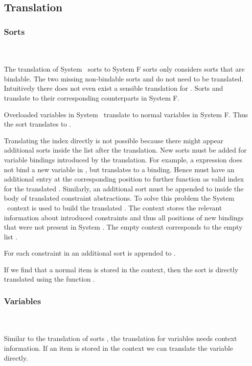 \subsection{Translation}
\subsubsection{Sorts}\hfill\\\\
The translation of System \Fo\ sorts to System F sorts only considers sorts that are bindable. 
The two missing non-bindable sorts  and  do not need to be translated. 
Intuitively there does not even exist a sensible translation for .
\DPTSort
Sorts  and  translate to their corresponding counterparts in System F. 

\noindent  Overloaded variables in System \Fo\ translate to normal variables in System F. 
Thus the sort  translates to . 

\noindent Translating the index  directly is not possible because there might appear additional sorts inside the list after the translation. 
New sorts must be added for variable bindings introduced by the translation. 
For example, a    \Constr{=}    expression does not bind a new variable in , but translates to a     binding. 
Hence  must have an additional entry  at the corresponding position to further function as valid index for the translated . Similarly, an additional sort  must be appended to  inside the body of translated constraint abstractions.
To solve this problem the System \Fo\ context  is used to build the translated . 
The context stores the relevant information about introduced constraints and thus all positions of new bindings that were not present in System \Fo. 
\DPTSorts
The empty context  corresponds to the empty list \Constr{[]}.

\noindent For each constraint in  an additional sort  is appended to .

\noindent If we find that a normal item is stored in the context, then the sort  is directly translated using the function .

\subsubsection{Variables}\hfill\\\\
Similar to the translation of sorts , the translation for variables  needs context information.  
\DPTVar
If an item is stored in the context we can translate the variable directly. 

